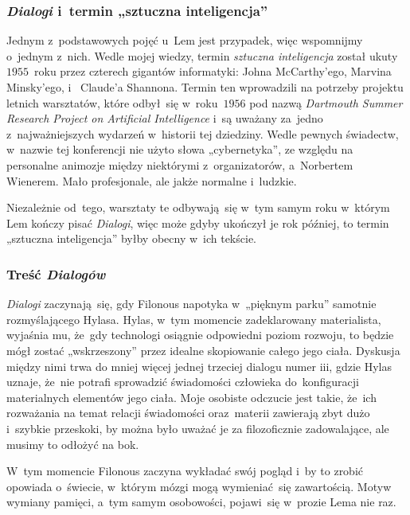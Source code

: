 \documentclass[10pt,t]{beamer}
\begin{document}
\begin{frame}
  \frametitle{\textit{Dialogi} i~termin „sztuczna
    inteligencja”}


  Jednym z~podstawowych pojęć u~Lem jest przypadek, więc wspomnijmy o~jednym
  z~nich. Wedle mojej wiedzy, termin \textit{sztuczna inteligencja} został
  ukuty $1955$~roku przez czterech gigantów informatyki:
  {Johna McCarthy’ego},
  {Marvina Minsky’ego},
  i~
  {Claude’a Shannona}. Termin ten wprowadzili na potrzeby projektu letnich
  warsztatów, które odbył~się w~roku~$1956$ pod nazwą
  \textit{Dartmouth Summer Research Project on Artificial Intelligence}
  i~są uważany za~jedno z~najważniejszych wydarzeń w~historii tej
  dziedziny. Wedle pewnych świadectw, w~nazwie tej konferencji nie użyto
  słowa „cybernetyka”, ze względu na personalne animozje między niektórymi
  z~organizatorów, a~Norbertem Wienerem. Mało profesjonale, ale jakże
  normalne i~ludzkie.

  Niezależnie od~tego, warsztaty te odbywają~się w~tym samym roku w~którym
  Lem kończy pisać \textit{Dialogi}, więc może gdyby ukończył je rok
  później, to termin „sztuczna inteligencja” byłby obecny w~ich tekście.


\end{frame}





\begin{frame}
  \frametitle{Treść \textit{Dialogów}}


  \textit{Dialogi} zaczynają~się, gdy Filonous napotyka w~„pięknym parku”
  samotnie rozmyślającego Hylasa. Hylas, w~tym momencie zadeklarowany
  materialista, wyjaśnia mu, że~gdy technologi osiągnie odpowiedni
  poziom rozwoju, to będzie mógł zostać „wskrzeszony” przez idealne
  skopiowanie całego jego ciała. Dyskusja między nimi trwa do mniej więcej
  jednej trzeciej dialogu numer iii, gdzie Hylas uznaje, że~nie potrafi
  sprowadzić świadomości człowieka do~konfiguracji materialnych elementów
  jego ciała. Moje osobiste odczucie jest takie, że~ich rozważania na temat
  relacji świadomości oraz~materii zawierają zbyt dużo i~szybkie przeskoki,
  by można było uważać je za filozoficznie zadowalające, ale musimy to
  odłożyć na bok.

  W~tym momencie Filonous zaczyna wykładać swój pogląd i~by to zrobić
  opowiada o~świecie, w~którym mózgi mogą wymieniać~się zawartością. Motyw
  wymiany pamięci, a~tym samym osobowości, pojawi~się w~prozie Lema nie raz.

\end{frame}
\end{document}
